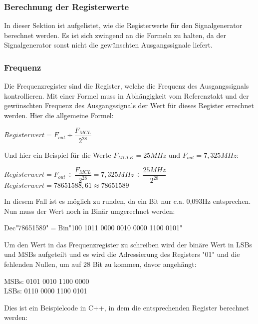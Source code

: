 \subsubsection{Berechnung der Registerwerte}
In dieser Sektion ist aufgelistet, wie die Registerwerte für den Signalgenerator berechnet werden. Es ist sich zwingend an die Formeln zu halten, da der Signalgenerator sonst nicht die gewünschten Ausgangssignale liefert.
\subsubsection*{Frequenz}
Die Frequenzregister sind die Register, welche die Frequenz des Ausgangssignals kontrollieren. Mit einer Formel muss in Abhängigkeit vom Referenztakt und der gewünschten Frequenz des Ausgangssignals der Wert für dieses Register errechnet werden. Hier die allgemeine Formel:\\

\begin{center}
$Registerwert=F_{out}\div \dfrac{F_{MCL}}{2^{28}}$\\
\end{center}
Und hier ein Beispiel für die Werte $F_{MCLK}=25MHz$ und $F_{out}= 7,325MHz$:\\
\begin{center}
$Registerwert=F_{out}\div \dfrac{F_{MCL}}{2^{28}}=7,325MHz\div \dfrac{25MHz}{2^{28}}$\\
\medskip
$Registerwert=78651588,61 \approx 78651589$\\
\end{center}
In diesem Fall ist es möglich zu runden, da ein Bit nur c.a. 0,093Hz entsprechen. Nun muss der Wert noch in Binär umgerechnet werden:\\
\begin{center}
Dec"78651589"$ = $Bin"100 1011 0000 0010 0000 1100 0101"\\
\end{center}
Um den Wert in das Frequenzregister zu schreiben wird der binäre Wert in LSBs und MSBs aufgeteilt und es wird die Adressierung des Registers "01" und die fehlenden Nullen, um auf 28 Bit zu kommen, davor angehängt:
\begin{center}
MSBs: 0101 0010 1100 0000\\
LSBs: 0110 0000 1100 0101\\
\end{center}
\pagebreak
Dies ist ein Beispielcode in C++, in dem die entsprechenden Register berechnet werden:
\lstset{style=C}


